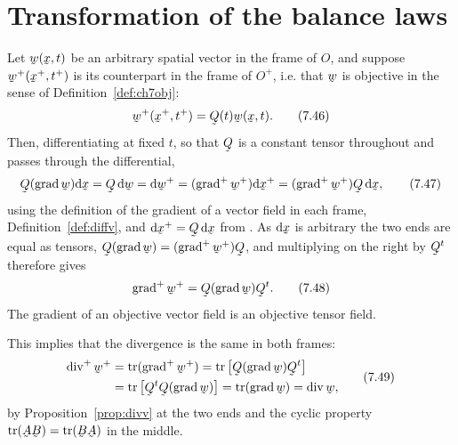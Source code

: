 \section{Transformation of the balance laws}\label{sec:ch7balance}

Let $\bw(\bx,t)$ be an arbitrary spatial vector in the frame of $O$, and
suppose $\bw^{+}(\bx^{+},t^{+})$ is its counterpart in the frame of
$O^{+}$, i.e. that $\bw$ is objective in the sense of
Definition~\ref{def:ch7obj}:
\begin{equation}
   \bw^{+}(\bx^{+},t^{+})=\bQ(t)\bw(\bx,t).
   \tag{7.46}\label{eq:7.46}
\end{equation}
Then, differentiating at fixed $t$, so that $\bQ$ is a constant tensor
throughout and passes through the differential,
\begin{equation}
   \bQ(\grad\bw)\dl\bx=\bQ\,\dl\bw=\dl\bw^{+}
   =(\grad^{+}\bw^{+})\dl\bx^{+}=(\grad^{+}\bw^{+})\bQ\,\dl\bx ,
   \tag{7.47}\label{eq:7.47}
\end{equation}
using the definition of the gradient of a vector field in each frame,
Definition~\ref{def:diffv}, and $\dl\bx^{+}=\bQ\,\dl\bx$ from .
As $\dl\bx$ is arbitrary the two ends are equal as tensors,
$\bQ(\grad\bw)=(\grad^{+}\bw^{+})\bQ$, and multiplying on the right by
$\bQ^{t}$ therefore gives
\begin{equation}
   \grad^{+}\bw^{+}=\bQ(\grad\bw)\bQ^{t}.
   \tag{7.48}\label{eq:7.48}
\end{equation}
The gradient of an objective vector field is an objective tensor field.

This implies that the divergence is the same in both frames:
\begin{equation}
\begin{aligned}
   \dvg^{+}\bw^{+}&=\tr(\grad^{+}\bw^{+})=\tr\big[\bQ(\grad\bw)\bQ^{t}\big]
   \\
   &=\tr\big[\bQ^{t}\bQ(\grad\bw)\big]=\tr(\grad\bw)=\dvg\bw ,
\end{aligned}
   \tag{7.49}\label{eq:7.49}
\end{equation}
by Proposition~\ref{prop:divv} at the two ends and the cyclic property
$\tr(\bA\bB)=\tr(\bB\bA)$ in the middle.

